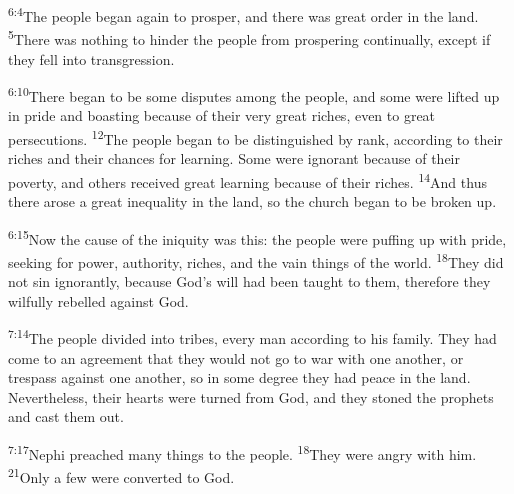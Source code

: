\documentclass[openany,12pt,english]{book}
\newenvironment{para}{\par\pretolerance=100\tolerance=200\setlength{\emergencystretch}{0.6em}\relax}{\par}
\begin{document}
\begin{para}
    \textsuperscript{6:4}\thinspace{}The peo\-ple be\-gan a\-gain to pros\-per, and there was great or\-der in the land.
    \textsuperscript{5}\thinspace{}There was noth\-ing to hind\-er the peo\-ple from prospering con\-tin\-u\-al\-ly, ex\-cept if they fell in\-to trans\-gres\-sion.
\end{para}

\begin{para}
    \textsuperscript{6:10}\thinspace{}There be\-gan to be some disputes a\-mong the peo\-ple, and some were lifted up in pride and boasting be\-cause of their ver\-y great rich\-es, e\-ven to great persecutions.
    \textsuperscript{12}\thinspace{}The peo\-ple be\-gan to be dis\-tin\-guished by rank, ac\-cord\-ing to their rich\-es and their chances for learn\-ing. Some were ig\-no\-rant be\-cause of their pov\-er\-ty, and others re\-ceived great learn\-ing be\-cause of their rich\-es.
    \textsuperscript{14}\thinspace{}And thus there a\-rose a great in\-e\-qual\-i\-ty in the land, so the church be\-gan to be bro\-ken up.
\end{para}

\begin{para}
    \textsuperscript{6:15}\thinspace{}Now the cause of the in\-iq\-ui\-ty was this: the peo\-ple were puffing up with pride, seek\-ing for pow\-er, au\-thor\-i\-ty, rich\-es, and the vain things of the world.
    \textsuperscript{18}\thinspace{}They did not sin ig\-no\-rant\-ly, be\-cause God's will had been taught to them, there\-fore they wil\-ful\-ly rebelled a\-gainst God.
\end{para}

\bigskip{}

\begin{para}
    \textsuperscript{7:14}\thinspace{}The peo\-ple di\-vid\-ed in\-to tribes, eve\-ry man ac\-cord\-ing to his fam\-i\-ly. They had come to an a\-gree\-ment that they would not go to war with one an\-oth\-er, or tres\-pass a\-gainst one an\-oth\-er, so in some de\-gree they had peace in the land. Nev\-er\-the\-less, their hearts were turned from God, and they stoned the prophets and cast them out.
\end{para}

\begin{para}
    \textsuperscript{7:17}\thinspace{}Nephi preached man\-y things to the peo\-ple.
    \textsuperscript{18}\thinspace{}They were an\-gry with him.
    \textsuperscript{21}\thinspace{}On\-ly a few were con\-vert\-ed to God.
\end{para}
\end{document}
